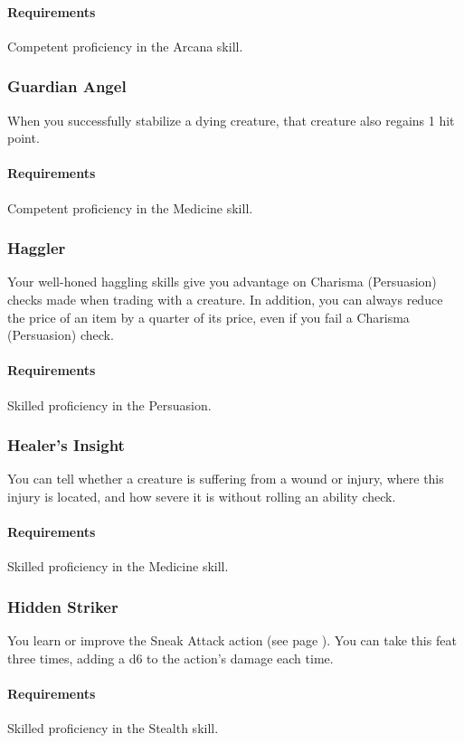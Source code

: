     \paragraph{Requirements} Competent proficiency in the Arcana skill.
\subsubsection{Guardian Angel} \label{feat::guardianangel}
    When you successfully stabilize a dying creature, that creature also regains 1 hit point.
    \paragraph{Requirements} Competent proficiency in the Medicine skill.
\subsubsection{Haggler} \label{feat::haggler}
    Your well-honed haggling skills give you advantage on Charisma (Persuasion) checks made when trading with a creature.
    In addition, you can always reduce the price of an item by a quarter of its price, even if you fail a Charisma (Persuasion) check.
    \paragraph{Requirements} Skilled proficiency in the Persuasion.
\subsubsection{Healer's Insight} \label{feat::healersinsight}
    You can tell whether a creature is suffering from a wound or injury, where this injury is located, and how severe it is without rolling an ability check.
    \paragraph{Requirements} Skilled proficiency in the Medicine skill.
\subsubsection{Hidden Striker} \label{feat::hiddenstriker}
    You learn or improve the Sneak Attack action (see page \pageref{act:sneakattack}).
    You can take this feat three times, adding a d6 to the action's damage each time.
    \paragraph{Requirements} Skilled proficiency in the Stealth skill.
